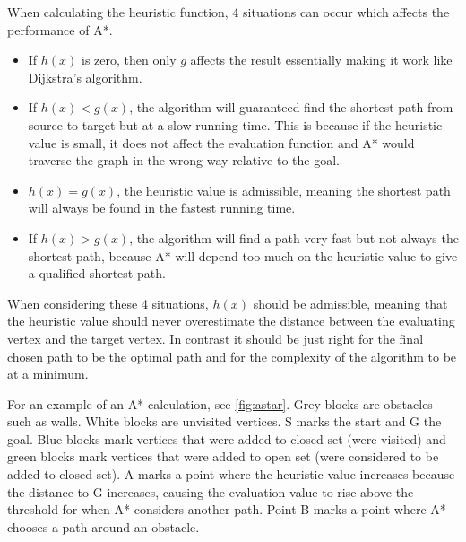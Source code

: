 


  When calculating the heuristic function, 4 situations can occur which affects the performance of A*.

    \begin{itemize}
    \item If $h(x)$ is zero, then only $g$ affects the result essentially making it work like Dijkstra's algorithm.

    \item If $h(x) < g(x)$, the algorithm will guaranteed find the shortest path from source to target but at a slow running time. This is because if the heuristic value is small, it does not affect the evaluation function and A* would traverse the graph in the wrong way relative to the goal. 

    \item $h(x) = g(x)$, the heuristic value is admissible, meaning the shortest path will always be found in the fastest running time.

    \item If $h(x) > g(x)$, the algorithm will find a path very fast but not always the shortest path, because A* will depend too much on the heuristic value to give a qualified shortest path.
  \end{itemize}

  When considering these 4 situations, $h(x)$ should be admissible, meaning that the heuristic value should never overestimate the distance between the evaluating vertex and the target vertex. In contrast it should be just right for the final chosen path to be the optimal path and for the complexity of the algorithm to be at a minimum.


  For an example of an A* calculation, see \cref{fig:astar}. 
  Grey blocks are obstacles such as walls. White blocks are unvisited vertices. S marks the start and G the goal. Blue blocks mark vertices that were added to closed set (were visited) and green blocks mark vertices that were added to open set (were considered to be added to closed set). A marks a point where the heuristic value increases because the distance to G increases, causing the evaluation value to rise above the threshold for when A* considers another path. Point B marks a point where A* chooses a path around an obstacle.



